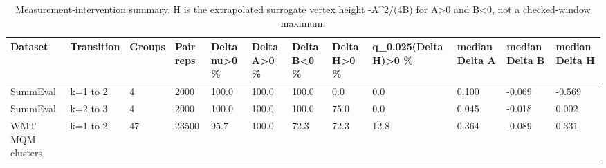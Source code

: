 \begin{table}[t]
\centering
\small
\begin{tabular}{llllllllllll}
\toprule
Dataset & Transition & Groups & Pair reps & Delta nu>0 \% & Delta A>0 \% & Delta B<0 \% & Delta H>0 \% & q\_0.025(Delta H)>0 \% & median Delta A & median Delta B & median Delta H \\
\midrule
SummEval & k=1 to 2 & 4 & 2000 & 100.0 & 100.0 & 100.0 & 0.0 & 0.0 & 0.100 & -0.069 & -0.569 \\
SummEval & k=2 to 3 & 4 & 2000 & 100.0 & 100.0 & 100.0 & 75.0 & 0.0 & 0.045 & -0.018 & 0.002 \\
WMT MQM clusters & k=1 to 2 & 47 & 23500 & 95.7 & 100.0 & 72.3 & 72.3 & 12.8 & 0.364 & -0.089 & 0.331 \\
\bottomrule
\end{tabular}
\vspace{0.25em}
\caption{Measurement-intervention summary. H is the extrapolated surrogate vertex height -A\textasciicircum{}2/(4B) for A>0 and B<0, not a checked-window maximum.}
\label{tab:measurement-intervention}
\end{table}
